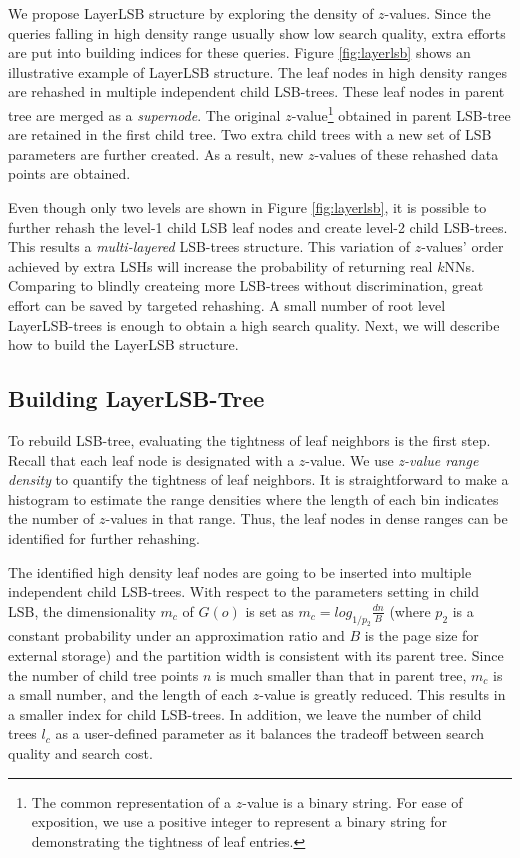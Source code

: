 We propose LayerLSB structure by exploring the density of $z$-values. Since the queries falling in high density range usually show low search quality, extra efforts are put into building indices for these queries. Figure \ref{fig:layerlsb} shows an illustrative example of LayerLSB structure. The leaf nodes in high density ranges are rehashed in multiple independent child LSB-trees. These leaf nodes in parent tree are merged as a \emph{supernode}. The original $z$-value\footnote{The common representation of a $z$-value is a binary string. For ease of exposition, we use a positive integer to represent a binary string for demonstrating the tightness of leaf entries.} obtained in parent LSB-tree are retained in the first child tree. Two extra child trees with a new set of LSB parameters are further created. As a result, new $z$-values of these rehashed data points are obtained.

Even though only two levels are shown in Figure \ref{fig:layerlsb}, it is possible to further rehash the level-1 child LSB leaf nodes and create level-2 child LSB-trees. This results a \emph{multi-layered} LSB-trees structure. This variation of $z$-values' order achieved by extra LSHs will increase the probability of returning real $k$NNs. Comparing to blindly createing more LSB-trees without discrimination, great effort can be saved by targeted rehashing. A small number of root level LayerLSB-trees is enough to obtain a high search quality. Next, we will describe how to build the LayerLSB structure.


\subsection{Building LayerLSB-Tree}

 To rebuild LSB-tree, evaluating the tightness of leaf neighbors is the first step. Recall that each leaf node is designated with a $z$-value. We use \emph{z-value range density} to quantify the tightness of leaf neighbors. It is straightforward to make a histogram to estimate the range densities where the length of each bin indicates the number of $z$-values in that range. Thus, the leaf nodes in dense ranges can be identified for further rehashing.

 The identified high density leaf nodes are going to be inserted into multiple independent child LSB-trees. With respect to the parameters setting in child LSB, the dimensionality $m_{c}$ of $G(o)$ is set as $m_{c}=log_{1/p_2}{\frac{dn}{B}}$ (where $p_2$ is a constant probability under an approximation ratio and $B$ is the page size for external storage) \cite{lsb} and the partition width is consistent with its parent tree. Since the number of child tree points $n$ is much smaller than that in parent tree, $m_{c}$ is a small number, and the length of each $z$-value is greatly reduced. This results in a smaller index for child LSB-trees. In addition, we leave the number of child trees $l_{c}$ as a user-defined parameter as it balances the tradeoff between search quality and search cost.

